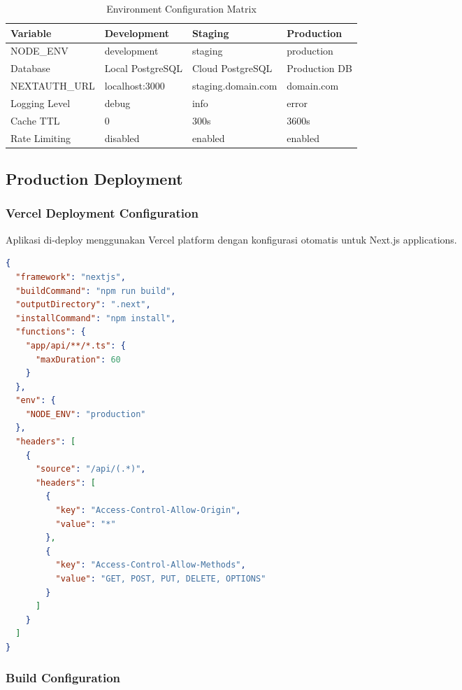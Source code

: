 \begin{table}[H]
\centering
\caption{Environment Configuration Matrix}
\begin{tabular}{|l|l|l|l|}
\hline
\textbf{Variable} & \textbf{Development} & \textbf{Staging} & \textbf{Production} \\
\hline
NODE\_ENV & development & staging & production \\
Database & Local PostgreSQL & Cloud PostgreSQL & Production DB \\
NEXTAUTH\_URL & localhost:3000 & staging.domain.com & domain.com \\
Logging Level & debug & info & error \\
Cache TTL & 0 & 300s & 3600s \\
Rate Limiting & disabled & enabled & enabled \\
\hline
\end{tabular}
\end{table}

\subsection{Production Deployment}

\subsubsection{Vercel Deployment Configuration}

Aplikasi di-deploy menggunakan Vercel platform dengan konfigurasi otomatis untuk Next.js applications.

\begin{lstlisting}[language=JSON, caption=vercel.json Configuration]
{
  "framework": "nextjs",
  "buildCommand": "npm run build",
  "outputDirectory": ".next",
  "installCommand": "npm install",
  "functions": {
    "app/api/**/*.ts": {
      "maxDuration": 60
    }
  },
  "env": {
    "NODE_ENV": "production"
  },
  "headers": [
    {
      "source": "/api/(.*)",
      "headers": [
        {
          "key": "Access-Control-Allow-Origin",
          "value": "*"
        },
        {
          "key": "Access-Control-Allow-Methods",
          "value": "GET, POST, PUT, DELETE, OPTIONS"
        }
      ]
    }
  ]
}
\end{lstlisting}

\subsubsection{Build Configuration}

